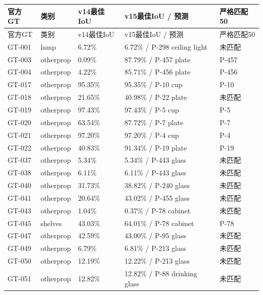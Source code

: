 \documentclass[UTF8,fontset=fandol]{ctexart}
\begin{document}
{\small
\begin{longtable}{|p{}|p{}|p{}|p{}|p{}|}
\hline
官方GT & 类别 & v14最佳IoU & v15最佳IoU / 预测 & 严格匹配50 \\ \hline
\endfirsthead
\hline
官方GT & 类别 & v14最佳IoU & v15最佳IoU / 预测 & 严格匹配50 \\ \hline
\endhead
GT-001 & lamp & 6.72\% & 6.72\% / P-298 ceiling light & 未匹配 \\ \hline
GT-003 & otherprop & 0.09\% & 87.79\% / P-457 plate & P-457 \\ \hline
GT-004 & otherprop & 4.22\% & 85.71\% / P-456 plate & P-456 \\ \hline
GT-017 & otherprop & 95.35\% & 95.35\% / P-10 cup & P-10 \\ \hline
GT-018 & otherprop & 21.65\% & 40.98\% / P-22 plate & 未匹配 \\ \hline
GT-019 & otherprop & 97.43\% & 97.43\% / P-5 cup & P-5 \\ \hline
GT-020 & otherprop & 63.54\% & 87.72\% / P-7 plate & P-7 \\ \hline
GT-021 & otherprop & 97.20\% & 97.20\% / P-4 cup & P-4 \\ \hline
GT-022 & otherprop & 40.83\% & 91.34\% / P-19 plate & P-19 \\ \hline
GT-037 & otherprop & 5.34\% & 5.34\% / P-443 glass & 未匹配 \\ \hline
GT-038 & otherprop & 6.11\% & 6.11\% / P-443 glass & 未匹配 \\ \hline
GT-040 & otherprop & 31.73\% & 38.82\% / P-240 glass & 未匹配 \\ \hline
GT-041 & otherprop & 20.64\% & 43.02\% / P-455 glass & 未匹配 \\ \hline
GT-043 & otherprop & 1.04\% & 0.37\% / P-78 cabinet & 未匹配 \\ \hline
GT-045 & shelves & 43.03\% & 64.01\% / P-78 cabinet & P-78 \\ \hline
GT-047 & otherprop & 42.59\% & 43.00\% / P-95 glass & 未匹配 \\ \hline
GT-049 & otherprop & 6.79\% & 6.81\% / P-213 glass & 未匹配 \\ \hline
GT-050 & otherprop & 12.19\% & 12.22\% / P-213 glass & 未匹配 \\ \hline
GT-051 & otherprop & 12.82\% & 12.82\% / P-88 drinking glass & 未匹配 \\ \hline

\end{longtable}}
\end{document}

